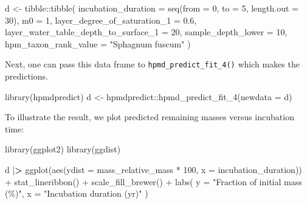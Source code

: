 \documentclass[
  12pt,
]{article}
\newenvironment{Shaded}{\begin{snugshade}}{\end{snugshade}}
\newcommand{\AttributeTok}[1]{\textcolor[rgb]{0.77,0.63,0.00}{#1}}
\newcommand{\DecValTok}[1]{\textcolor[rgb]{0.00,0.00,0.81}{#1}}
\newcommand{\ErrorTok}[1]{\textcolor[rgb]{0.64,0.00,0.00}{\textbf{#1}}}
\newcommand{\FloatTok}[1]{\textcolor[rgb]{0.00,0.00,0.81}{#1}}
\newcommand{\FunctionTok}[1]{\textcolor[rgb]{0.00,0.00,0.00}{#1}}
\newcommand{\NormalTok}[1]{#1}
\newcommand{\OtherTok}[1]{\textcolor[rgb]{0.56,0.35,0.01}{#1}}
\newcommand{\SpecialCharTok}[1]{\textcolor[rgb]{0.00,0.00,0.00}{#1}}
\newcommand{\StringTok}[1]{\textcolor[rgb]{0.31,0.60,0.02}{#1}}
\begin{document}
\begin{Shaded}
\begin{Highlighting}[]
\NormalTok{d }\OtherTok{\textless{}{-}} 
\NormalTok{  tibble}\SpecialCharTok{::}\FunctionTok{tibble}\NormalTok{(}
    \AttributeTok{incubation\_duration =} \FunctionTok{seq}\NormalTok{(}\AttributeTok{from =} \DecValTok{0}\NormalTok{, }\AttributeTok{to =} \DecValTok{5}\NormalTok{, }\AttributeTok{length.out =} \DecValTok{30}\NormalTok{),}
    \AttributeTok{m0 =} \DecValTok{1}\NormalTok{,}
    \AttributeTok{layer\_degree\_of\_saturation\_1 =} \FloatTok{0.6}\NormalTok{,}
    \AttributeTok{layer\_water\_table\_depth\_to\_surface\_1 =} \DecValTok{20}\NormalTok{,}
    \AttributeTok{sample\_depth\_lower =} \DecValTok{10}\NormalTok{,}
    \AttributeTok{hpm\_taxon\_rank\_value =} \StringTok{"Sphagnum fuscum"}
\NormalTok{  )}
\end{Highlighting}
\end{Shaded}

Next, one can pass this data frame to \texttt{hpmd\_predict\_fit\_4()} which makes the predictions.

\begin{Shaded}
\begin{Highlighting}[]
\FunctionTok{library}\NormalTok{(hpmdpredict)}
\NormalTok{d }\OtherTok{\textless{}{-}}\NormalTok{ hpmdpredict}\SpecialCharTok{::}\FunctionTok{hpmd\_predict\_fit\_4}\NormalTok{(}\AttributeTok{newdata =}\NormalTok{ d)}
\end{Highlighting}
\end{Shaded}

To illustrate the result, we plot predicted remaining masses versus incubation time:

\begin{Shaded}
\begin{Highlighting}[]
\FunctionTok{library}\NormalTok{(ggplot2)}
\FunctionTok{library}\NormalTok{(ggdist)}

\NormalTok{d }\SpecialCharTok{|}\ErrorTok{\textgreater{}}
  \FunctionTok{ggplot}\NormalTok{(}\FunctionTok{aes}\NormalTok{(}\AttributeTok{ydist =}\NormalTok{ mass\_relative\_mass }\SpecialCharTok{*} \DecValTok{100}\NormalTok{, }\AttributeTok{x =}\NormalTok{ incubation\_duration)) }\SpecialCharTok{+}
  \FunctionTok{stat\_lineribbon}\NormalTok{() }\SpecialCharTok{+}
  \FunctionTok{scale\_fill\_brewer}\NormalTok{() }\SpecialCharTok{+}
  \FunctionTok{labs}\NormalTok{(}
    \AttributeTok{y =} \StringTok{"Fraction of initial mass (\%)"}\NormalTok{,}
    \AttributeTok{x =} \StringTok{"Incubation duration (yr)"}
\NormalTok{  )}
\end{Highlighting}
\end{Shaded}
\end{document}
